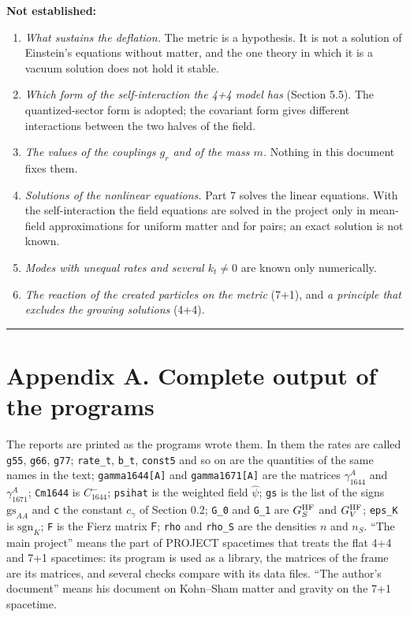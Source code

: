 \documentclass[
  10pt,
]{article}
\providecommand{\tightlist}{%
  \setlength{\itemsep}{0pt}\setlength{\parskip}{0pt}}
\begin{document}
\textbf{Not established:}

\begin{enumerate}
\def\labelenumi{\arabic{enumi}.}
\tightlist
\item
  \emph{What sustains the deflation.} The metric is a hypothesis. It is
  not a solution of Einstein's equations without matter, and the one
  theory in which it is a vacuum solution does not hold it stable.
\item
  \emph{Which form of the self-interaction the 4+4 model has} (Section
  5.5). The quantized-sector form is adopted; the covariant form gives
  different interactions between the two halves of the field.
\item
  \emph{The values of the couplings \(g_r\) and of the mass \(m\).}
  Nothing in this document fixes them.
\item
  \emph{Solutions of the nonlinear equations.} Part 7 solves the linear
  equations. With the self-interaction the field equations are solved in
  the project only in mean-field approximations for uniform matter and
  for pairs; an exact solution is not known.
\item
  \emph{Modes with unequal rates and several \(k_t\neq0\)} are known
  only numerically.
\item
  \emph{The reaction of the created particles on the metric} (7+1), and
  \emph{a principle that excludes the growing solutions} (4+4).
\end{enumerate}

\begin{center}\rule{0.5\linewidth}{0.5pt}\end{center}

\hypertarget{appendix-a.-complete-output-of-the-programs}{%
\section{Appendix A. Complete output of the
programs}\label{appendix-a.-complete-output-of-the-programs}}

The reports are printed as the programs wrote them. In them the rates
are called \texttt{g55}, \texttt{g66}, \texttt{g77}; \texttt{rate\_t},
\texttt{b\_t}, \texttt{const5} and so on are the quantities of the same
names in the text; \texttt{gamma1644{[}A{]}} and
\texttt{gamma1671{[}A{]}} are the matrices \(\gamma_{1644}^A\) and
\(\gamma_{1671}^A\); \texttt{Cm1644} is \(C^-_{1644}\); \texttt{psihat}
is the weighted field \(\hat\psi\); \texttt{gs} is the list of the signs
\(\mathrm{gs}_{AA}\) and \texttt{c} the constant \(c_\gamma\) of Section
0.2; \texttt{G\_0} and \texttt{G\_1} are \(G_S^{\rm HF}\) and
\(G_V^{\rm HF}\); \texttt{eps\_K} is \(\mathrm{sgn}_K\); \texttt{F} is
the Fierz matrix \(\mathsf F\); \texttt{rho} and \texttt{rho\_S} are the
densities \(n\) and \(n_S\). ``The main project'' means the part of
PROJECT spacetimes that treats the flat 4+4 and 7+1 spacetimes: its
program is used as a library, the matrices of the frame are its
matrices, and several checks compare with its data files. ``The author's
document'' means his document on Kohn--Sham matter and gravity on the
7+1 spacetime.
\end{document}
